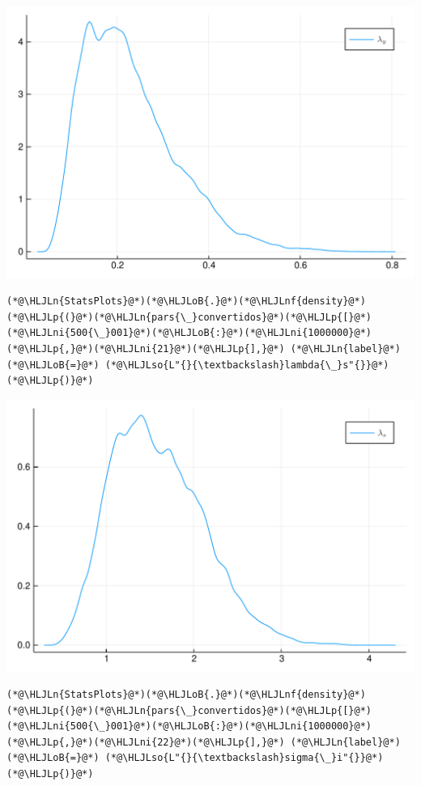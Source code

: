 \documentclass[12pt,a4paper]{article}
\newcommand{\HLJLn}[1]{#1}
\newcommand{\HLJLnf}[1]{\textcolor[RGB]{66,102,213}{#1}}
\newcommand{\HLJLso}[1]{\textcolor[RGB]{201,61,57}{#1}}
\newcommand{\HLJLni}[1]{\textcolor[RGB]{59,151,46}{#1}}
\newcommand{\HLJLoB}[1]{\textcolor[RGB]{102,102,102}{\textbf{#1}}}
\newcommand{\HLJLp}[1]{#1}
\begin{document}
\includegraphics[width=\linewidth]{figures/carlos_mcmc_21_1.pdf}

\begin{lstlisting}
(*@\HLJLn{StatsPlots}@*)(*@\HLJLoB{.}@*)(*@\HLJLnf{density}@*)(*@\HLJLp{(}@*)(*@\HLJLn{pars{\_}convertidos}@*)(*@\HLJLp{[}@*)(*@\HLJLni{500{\_}001}@*)(*@\HLJLoB{:}@*)(*@\HLJLni{1000000}@*)(*@\HLJLp{,}@*)(*@\HLJLni{21}@*)(*@\HLJLp{],}@*) (*@\HLJLn{label}@*)(*@\HLJLoB{=}@*) (*@\HLJLso{L"{}{\textbackslash}lambda{\_}s"{}}@*)(*@\HLJLp{)}@*)
\end{lstlisting}

\includegraphics[width=\linewidth]{figures/carlos_mcmc_22_1.pdf}

\begin{lstlisting}
(*@\HLJLn{StatsPlots}@*)(*@\HLJLoB{.}@*)(*@\HLJLnf{density}@*)(*@\HLJLp{(}@*)(*@\HLJLn{pars{\_}convertidos}@*)(*@\HLJLp{[}@*)(*@\HLJLni{500{\_}001}@*)(*@\HLJLoB{:}@*)(*@\HLJLni{1000000}@*)(*@\HLJLp{,}@*)(*@\HLJLni{22}@*)(*@\HLJLp{],}@*) (*@\HLJLn{label}@*)(*@\HLJLoB{=}@*) (*@\HLJLso{L"{}{\textbackslash}sigma{\_}i"{}}@*)(*@\HLJLp{)}@*)
\end{lstlisting}
\end{document}
